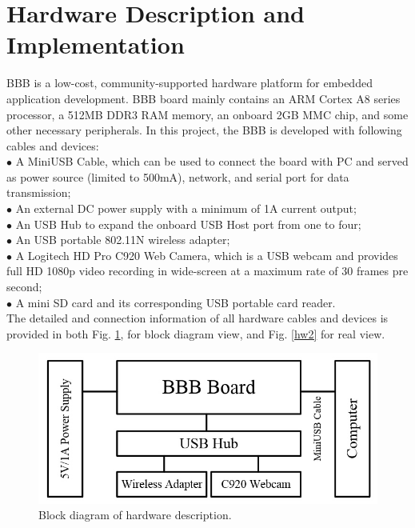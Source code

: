 \documentclass[12pt,journal,draftclsnofoot,onecolumn]{IEEEtran}
\begin{document}
\section{Hardware Description and Implementation}\label{HdDes}
BBB is a low-cost, community-supported hardware platform for embedded application development. BBB board mainly contains an ARM Cortex A8 series processor, a 512MB DDR3 RAM memory, an onboard 2GB MMC chip, and some other necessary peripherals. In this project, the BBB is developed with following cables and devices: \\
$\bullet$ A MiniUSB Cable, which can be used to connect the board with PC and served as power source (limited to 500mA), network, and serial port for data transmission;\\
$\bullet$ An external DC power supply with a minimum of 1A current output;\\
$\bullet$ An USB Hub to expand the onboard USB Host port from one to four;\\
$\bullet$ An USB portable 802.11N wireless adapter;\\
$\bullet$ A Logitech HD Pro C920 Web Camera, which is a USB webcam and provides full HD 1080p video recording in wide-screen at a maximum rate of 30 frames pre second;\\
$\bullet$ A mini SD card and its corresponding USB portable card reader.\\
The detailed and connection information of all hardware cables and devices is provided in both Fig. \ref{hw1}, for block diagram view, and Fig. \ref{hw2} for real view.
\begin{figure}[ht]
	\centering
	\includegraphics[width=5in]{./figs/hw1.jpg}
	\caption{Block diagram of hardware description.}
	\label{hw1}
\end{figure}
\end{document}
